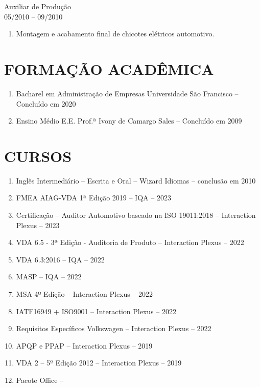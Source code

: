 \documentclass[10.5pt, a4paper]{report}
\begin{document}
Auxiliar de Produção
\vspace{3pt}\\
{\footnotesize 05/2010 – 09/2010}
\begin{enumerate}[leftmargin=32pt, topsep=15pt, itemsep=8pt, labelsep=10pt, align=left]
  \item Montagem e acabamento final de chicotes elétricos automotivo.
\end{enumerate}



\section{FORMAÇÃO ACADÊMICA}

\begin{enumerate}[label={\resizebox{0.4em}{!}{$\blacksquare$}}, leftmargin=32pt, topsep=15pt, itemsep=8pt, labelsep=10pt, align=left]\item Bacharel em Administração de Empresas
\newline Universidade São Francisco – Concluído em 2020
\item Ensino Médio
\newline E.E. Prof.ª Ivony de Camargo Sales – Concluído em 2009
\end{enumerate}

\section{CURSOS}
\begin{enumerate}[label={\resizebox{0.4em}{!}{$\blacksquare$}}, leftmargin=32pt, topsep=15pt, itemsep=0pt, labelsep=10pt, align=left]
  \item Inglês Intermediário – Escrita e Oral – Wizard Idiomas – conclusão em 2010
  \item FMEA AIAG-VDA 1ª Edição 2019 – IQA – 2023
  \item Certificação – Auditor Automotivo baseado na ISO 19011:2018 – Interaction Plexus – 2023
  \item VDA 6.5 - 3ª Edição - Auditoria de Produto – Interaction Plexus – 2022
  \item VDA 6.3:2016 – IQA – 2022
  \item MASP – IQA – 2022
  \item MSA 4º Edição – Interaction Plexus – 2022
  \item IATF16949 + ISO9001 – Interaction Plexus – 2022
  \item Requisitos Específicos Volkswagen – Interaction Plexus – 2022
  \item APQP e PPAP – Interaction Plexus – 2019
  \item VDA 2 – 5º Edição 2012 – Interaction Plexus – 2019
  \item Pacote Office – 
\end{enumerate}
\end{document}
